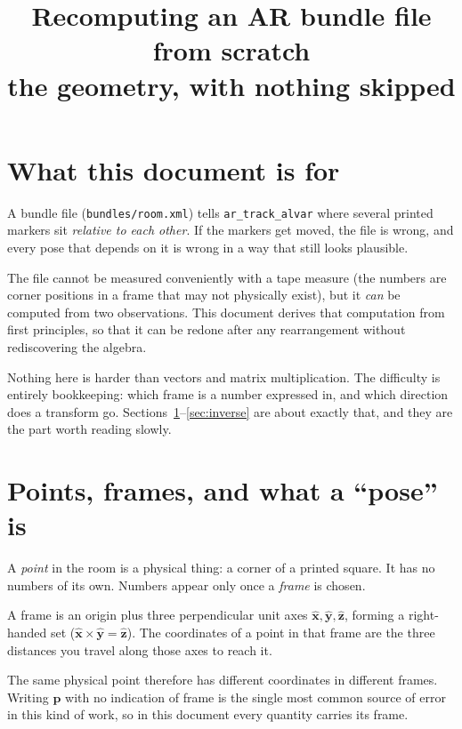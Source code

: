 \documentclass[11pt,a4paper]{article}
\title{Recomputing an AR bundle file from scratch\\
       \large the geometry, with nothing skipped}
\date{}
\newcommand{\vt}[1]{\mathbf{#1}}
\newcommand{\xh}{\hat{\vt{x}}}
\newcommand{\yh}{\hat{\vt{y}}}
\newcommand{\zh}{\hat{\vt{z}}}
\begin{document}
\maketitle

\section*{What this document is for}

A bundle file (\texttt{bundles/room.xml}) tells \texttt{ar\_track\_alvar} where several
printed markers sit \emph{relative to each other}. If the markers get moved, the file is
wrong, and every pose that depends on it is wrong in a way that still looks plausible.

The file cannot be measured conveniently with a tape measure (the numbers are corner
positions in a frame that may not physically exist), but it \emph{can} be computed from
two observations. This document derives that computation from first principles, so that
it can be redone after any rearrangement without rediscovering the algebra.

Nothing here is harder than vectors and matrix multiplication. The difficulty is
entirely bookkeeping: which frame is a number expressed in, and which direction does a
transform go. Sections~\ref{sec:frames}--\ref{sec:inverse} are about exactly that, and
they are the part worth reading slowly.

\tableofcontents

\section{Points, frames, and what a ``pose'' is}
\label{sec:frames}

A \emph{point} in the room is a physical thing: a corner of a printed square. It has no
numbers of its own. Numbers appear only once a \emph{frame} is chosen.

A frame is an origin plus three perpendicular unit axes $\xh,\yh,\zh$, forming a
right-handed set ($\xh \times \yh = \zh$). The coordinates of a point in that frame are
the three distances you travel along those axes to reach it.

The same physical point therefore has different coordinates in different frames. Writing
$\vt{p}$ with no indication of frame is the single most common source of error in this
kind of work, so in this document every quantity carries its frame.
\end{document}
